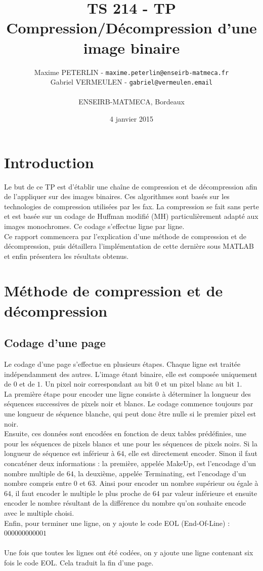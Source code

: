 \documentclass[11pt]{article}
\title{\textbf{TS 214 - TP}\\Compression/Décompression d'une image binaire}
\author{Maxime PETERLIN - \texttt{maxime.peterlin@enseirb-matmeca.fr}\\
Gabriel VERMEULEN - \texttt{gabriel@vermeulen.email} \\\\{ENSEIRB-MATMECA, Bordeaux}}
\date{4 janvier 2015}
\begin{document}
\maketitle
\tableofcontents

\newpage

\section{Introduction}

  Le but de ce TP est d'établir une chaîne de compression et de décompression afin de l'appliquer sur des images binaires. Ces algorithmes sont basés sur les technologies de compression utilisées par les fax. La compression se fait sans perte et est basée sur un codage de Huffman modifié (MH) particulièrement adapté aux images monochromes. Ce codage s'effectue ligne par ligne.\\
  Ce rapport commencera par l’explication d'une méthode de compression et de décompression, puis détaillera l'implémentation de cette dernière sous MATLAB et enfin présentera les résultats obtenus.

\section{Méthode de compression et de décompression}

  \subsection{Codage d'une page}
  
  Le codage d'une page s'effectue en plusieurs étapes. Chaque ligne est traitée indépendamment des autres. L'image étant binaire, elle est composée uniquement de $0$ et de $1$. Un pixel noir correspondant au bit $0$ et un pixel blanc au bit $1$.\\
  La première étape pour encoder une ligne consiste à déterminer la longueur des séquences successives de pixels noir et blancs. Le codage commence toujours par une longueur de séquence blanche, qui peut donc être nulle si le premier pixel est noir.\\
  Ensuite, ces données sont encodées en fonction de deux tables prédéfinies, une pour les séquences de pixels blancs et une pour les séquences de pixels noirs. Si la longueur de séquence est inférieur à $64$, elle est directement encoder. Sinon il faut concaténer deux informations : la première, appelée MakeUp, est l'encodage d'un nombre multiple de $64$, la deuxième, appelée Terminating, est l'encodage d'un nombre compris entre $0$ et $63$. Ainsi pour encoder un nombre supérieur ou égale à $64$, il faut encoder le multiple le plus proche de $64$ par valeur inférieure et ensuite encoder le nombre résultant de la différence du nombre qu'on souhaite encode avec le multiple choisi.\\
  Enfin, pour terminer une ligne, on y ajoute le code EOL (End-Of-Line) : $000000000001$\\\\
  Une fois que toutes les lignes ont été codées, on y ajoute une ligne contenant six fois le code EOL. Cela traduit la fin d'une page.
  
\end{document}
